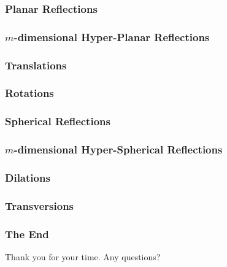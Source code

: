 \documentclass{beamer}
\begin{document}
\begin{frame}
\frametitle{Planar Reflections}
\end{frame}

\begin{frame}
\frametitle{$m$-dimensional Hyper-Planar Reflections}
\end{frame}

\begin{frame}
\frametitle{Translations}
\end{frame}

\begin{frame}
\frametitle{Rotations}
\end{frame}

\begin{frame}
\frametitle{Spherical Reflections}
\end{frame}

\begin{frame}
\frametitle{$m$-dimensional Hyper-Spherical Reflections}
\end{frame}

\begin{frame}
\frametitle{Dilations}
\end{frame}

\begin{frame}
\frametitle{Transversions}
\end{frame}

\begin{frame}
\frametitle{The End}
Thank you for your time.
Any questions?
\end{frame}


\end{document}
